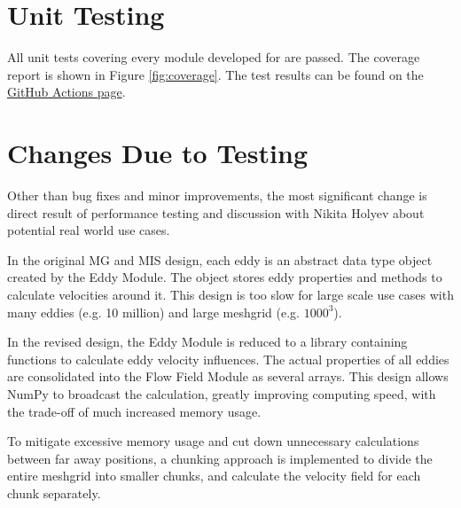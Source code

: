 \documentclass[12pt, titlepage]{article}
\begin{document}


\section{Unit Testing}
All unit tests covering every module developed for \progname{} are passed. The coverage report is shown in Figure \ref{fig:coverage}. The test results can be found on the \href{https://github.com/omltcat/turbulent-flow/actions/workflows/run-tests.yaml}{GitHub Actions page}.

\section{Changes Due to Testing}


Other than bug fixes and minor improvements, the most significant change is direct result of performance testing and discussion with Nikita Holyev about potential real world use cases.

In the original MG and MIS design, each eddy is an abstract data type object created by the Eddy Module. The object stores eddy properties and methods to calculate velocities around it. This design is too slow for large scale use cases with many eddies (e.g. 10 million) and large meshgrid (e.g. $1000^3$). 

In the revised design, the Eddy Module is reduced to a library containing functions to calculate eddy velocity influences. The actual properties of all eddies are consolidated into the Flow Field Module as several arrays. This design allows NumPy to broadcast the calculation, greatly improving computing speed, with the trade-off of much increased memory usage.

To mitigate excessive memory usage and cut down unnecessary calculations between far away positions, a chunking approach is implemented to divide the entire meshgrid into smaller chunks, and calculate the velocity field for each chunk separately. 
\end{document}
